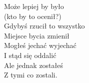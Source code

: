 \begin{text}
\begin{footTwelve}
    \vin Może lepiej by było\\
    \vin (kto by to ocenił?)\\
    \vin Gdybyś rzucił to wszystko\\
    \vin Miejsce bycia zmienił\\
    \vin Mogłeś jechać wyjechać\\
    \vin I stąd się oddalić\\
    \vin Ale jednak zostałeś\\
    \vin Z tymi co zostali.
\end{footTwelve}
\end{text}
\begin{chord}

\end{chord}